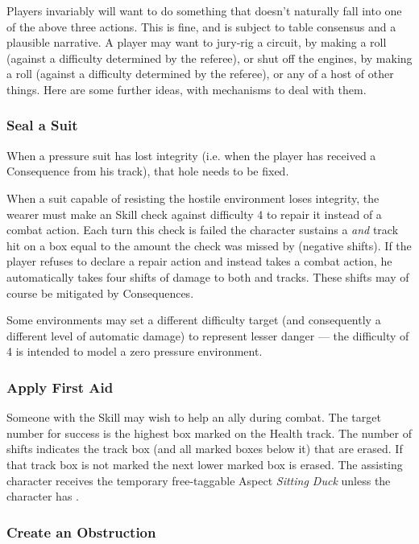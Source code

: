 Players invariably will want to do something that doesn't naturally fall into one of the above three actions. This is fine, and is subject to table consensus and a plausible narrative. A player may want to jury-rig a circuit, by making a  roll (against a difficulty determined by the referee), or shut off the engines, by making a  roll (against a difficulty determined by the referee), or any of a host of other things. Here are some further ideas, with mechanisms to deal with them.

\subsubsection{Seal a Suit}

When a pressure suit has lost integrity (i.e. when the player has received a Consequence from his \Health{} track), that hole needs to be fixed.

When a suit capable of resisting the hostile environment loses integrity, the wearer must make an  Skill check against difficulty 4 to repair it instead of a combat action. Each turn this check is failed the character sustains a \Composure{} \emph{and} \Health{} track hit on a box equal to the amount the check was missed by (negative shifts). If the player refuses to declare a repair action and instead takes a combat action, he automatically takes four shifts of damage to both \Composure{} and \Health{} tracks. These shifts may of course be mitigated by Consequences.

Some environments may set a different difficulty target (and consequently a different level of automatic damage) to represent lesser danger --- the difficulty of 4 is intended to model a zero pressure environment.

\subsubsection{Apply First Aid}

Someone with the  Skill may wish to help an ally during combat. The target number for success is the highest box marked on the Health track. The number of shifts indicates the track box (and all marked boxes below it) that are erased. If that track box is not marked the next lower marked box is erased. The assisting character receives the temporary free-taggable Aspect \emph{Sitting Duck} unless the character has .

\subsubsection{Create an Obstruction}

